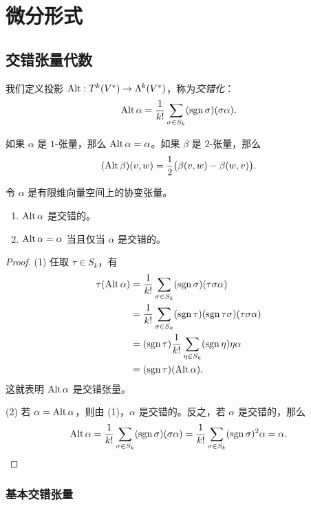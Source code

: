\chapter{微分形式}

\section{交错张量代数}

我们定义投影 $\operatorname{Alt}:T^k(V^*)\to \Lambda^k(V^*)$，称为\emph{交错化}：
\[
  \operatorname{Alt}\alpha=\frac{1}{k!}\sum_{\sigma\in S_k}(\operatorname{sgn}\sigma)  (\sigma\alpha).
\]

\begin{example}
  如果 $\alpha$ 是 $1$-张量，那么 $\operatorname{Alt}\alpha=\alpha$。如果 $\beta$
  是 $2$-张量，那么
  \[
    (\operatorname{Alt}\beta) (v,w)=\frac{1}{2}\bigl(\beta(v,w)-\beta(w,v)\bigr).
  \]
\end{example}

\begin{proposition}[交错化的性质]
  令 $\alpha$ 是有限维向量空间上的协变张量。
  \begin{enumerate}
    \item $\operatorname{Alt}\alpha$ 是交错的。
    \item $\operatorname{Alt}\alpha=\alpha$ 当且仅当 $\alpha$ 是交错的。
  \end{enumerate}
\end{proposition}
\begin{proof}
  (1) 任取 $\tau\in S_k$，有
  \begin{align*}
    \tau(\operatorname{Alt}\alpha)&=\frac{1}{k!}\sum_{\sigma\in S_k}(\operatorname{sgn}\sigma)(\tau\sigma\alpha)\\
    &=\frac{1}{k!}\sum_{\sigma\in S_k}(\operatorname{sgn}\tau)(\operatorname{sgn}\tau\sigma)(\tau\sigma\alpha)\\
    &=(\operatorname{sgn}\tau)\frac{1}{k!}\sum_{\eta\in S_k}(\operatorname{sgn}\eta)\eta\alpha\\
    &=(\operatorname{sgn}\tau)(\operatorname{Alt}\alpha).
  \end{align*}
  这就表明 $\operatorname{Alt} \alpha$ 是交错张量。
  
  (2) 若 $\alpha=\operatorname{Alt}\alpha$，则由 (1)，$\alpha$ 是交错的。反之，若
  $\alpha$ 是交错的，那么 
  \[
    \operatorname{Alt}\alpha=  \frac{1}{k!}\sum_{\sigma\in S_k}(\operatorname{sgn}\sigma)  (\sigma\alpha)
    =\frac{1}{k!}\sum_{\sigma\in S_k}(\operatorname{sgn}\sigma)^2\alpha=
    \alpha.\qedhere
  \]
\end{proof}

\subsection{基本交错张量}

